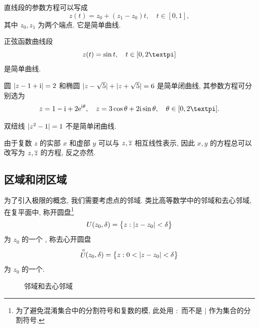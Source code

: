\begin{exampleenum}
  \item 直线段的参数方程可以写成
  \[
    z(t)=z_0+(z_1-z_0)t,\quad t\in[0,1],
  \]
  其中 $z_0,z_1$ 为两个端点.
  它是简单曲线.
  \item 正弦函数曲线段
  \[
    z(t)=\sin t,\quad t\in[0,2\cpi]
  \]
  是简单曲线.
  \item 圆 $\lvert z-1+\mathrm{i}\rvert=2$ 和椭圆 $\lvert z-\sqrt5\rvert+\lvert z+\sqrt5\rvert=6$ 是简单闭曲线, 其参数方程可分别选为
  \[
    z=1-\ii+2\ee^{\ii\theta},\quad
    z=3\cos\theta+2\ii\sin\theta,\quad
    \theta\in[0,2\cpi].
  \]
  \item 双纽线 $\lvert z^2-1\rvert=1$ 不是简单闭曲线.
\end{exampleenum}

由于复数 $z$ 的实部 $x$ 和虚部 $y$ 可以与 $z,\overline z$ 相互线性表示, 因此 $x,y$ 的方程总可以改写为 $z,\overline z$ 的方程, 反之亦然.


\subsection{区域和闭区域}

为了引入极限的概念, 我们需要考虑点的邻域.
类比高等数学中的邻域和去心邻域, 在复平面中, 称开圆盘\footnote{%
  为了避免混淆集合中的分割符号和复数的模, 此处用 $:$ 而不是 $\mid$ 作为集合的分割符号.%
}
\[
  U(z_0,\delta)=\bigl\{z\mathrel{:} \lvert z-z_0\rvert<\delta\bigr\}
\]
为 $z_0$ 的一个 , 称去心开圆盘
\[
  \stackrel{\circ}{U}\!\!(z_0,\delta)=\bigl\{z\mathrel{:} 0<\lvert z-z_0\rvert<\delta\bigr\}
\]
为 $z_0$ 的一个.

\begin{figure}[H]
  \centering
  \begin{minipage}{.4\textwidth}
    \centering
  \end{minipage}
  \begin{minipage}{.4\textwidth}
    \centering
  \end{minipage}
  \caption{邻域和去心邻域}
\end{figure}

